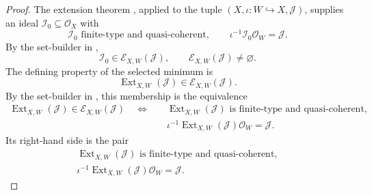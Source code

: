\begin{proof}
  The extension theorem
  {\cite[\href{https://stacks.math.columbia.edu/tag/01PF}{Tag 01PF}]
  {stacks-project}}, applied to the tuple
  $(X,\iota\colon W\hookrightarrow X,\mathcal J)$, supplies an ideal
  $\mathcal I_0\subseteq\mathcal O_X$ with
  \[
    \mathcal I_0\text{ finite-type and quasi-coherent},
    \qquad
    \iota^{-1}\mathcal I_0\mathcal O_W=\mathcal J.
  \]
  By the set-builder in
  ,
  \[
    \mathcal I_0\in\mathscr E_{X,W}(\mathcal J),
    \qquad
    \mathscr E_{X,W}(\mathcal J)\ne\varnothing.
  \]
  The defining property of the selected minimum is
  \[
    \operatorname{Ext}_{X,W}(\mathcal J)
      \in\mathscr E_{X,W}(\mathcal J).
  \]
  By the set-builder in
  , this membership is the
  equivalence
  \[
  \begin{aligned}
    \operatorname{Ext}_{X,W}(\mathcal J)
      \in\mathscr E_{X,W}(\mathcal J)
    \quad\Longleftrightarrow\quad
    &\operatorname{Ext}_{X,W}(\mathcal J)
       \text{ is finite-type and quasi-coherent},\\
    &\iota^{-1}\operatorname{Ext}_{X,W}(\mathcal J)
       \mathcal O_W=\mathcal J.
  \end{aligned}
  \]
  Its right-hand side is the pair
  \[
  \begin{gathered}
    \operatorname{Ext}_{X,W}(\mathcal J)
       \text{ is finite-type and quasi-coherent},\\
    \iota^{-1}\operatorname{Ext}_{X,W}(\mathcal J)
       \mathcal O_W=\mathcal J.
  \end{gathered}
  \]
\end{proof}

